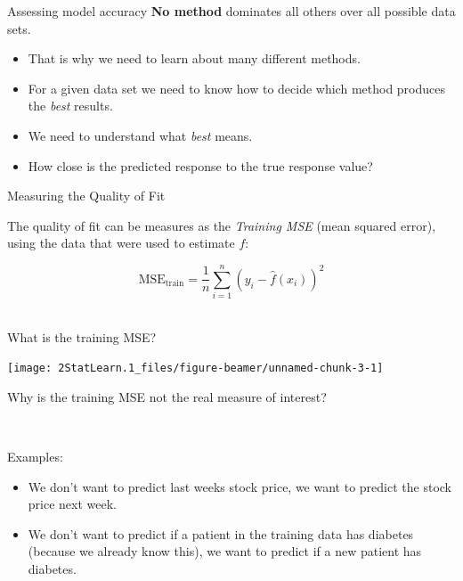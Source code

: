 \documentclass[
  ignorenonframetext,
]{beamer}
\providecommand{\tightlist}{%
  \setlength{\itemsep}{0pt}\setlength{\parskip}{0pt}}
\begin{document}
\begin{frame}{Assessing model accuracy}
\protect\hypertarget{assessing-model-accuracy}{}
\textbf{No method} dominates all others over all possible data sets.

\begin{itemize}
\tightlist
\item
  That is why we need to learn about many different methods.
\item
  For a given data set we need to know how to decide which method
  produces the \emph{best} results.
\item
  We need to understand what \emph{best} means.
\item
  How close is the predicted response to the true response value?
\end{itemize}
\end{frame}

\begin{frame}
\begin{block}{Measuring the Quality of Fit}
\protect\hypertarget{measuring-the-quality-of-fit}{}
\vspace{2mm}

The quality of fit can be measures as the \emph{Training MSE} (mean
squared error), using the data that were used to estimate \(f\):

\[ \text{MSE}_{\text{train}}=\frac{1}{n}\sum_{i=1}^n (y_i-\hat{f}(x_i))^2\]
\(~\)
\end{block}
\end{frame}

\begin{frame}
\begin{block}{What is the training MSE?}
\protect\hypertarget{what-is-the-training-mse}{}
\begin{center}\texttt{[image: 2StatLearn.1\_files/figure-beamer/unnamed-chunk-3-1]} \end{center}
\end{block}
\end{frame}

\begin{frame}
Why is the training MSE not the real measure of interest?

\(~\)

\pause

Examples:

\begin{itemize}
\item
  We don't want to predict last weeks stock price, we want to predict
  the stock price next week.
\item
  We don't want to predict if a patient in the training data has
  diabetes (because we already know this), we want to predict if a new
  patient has diabetes.
\end{itemize}
\end{frame}
\end{document}
